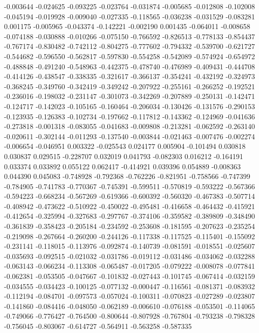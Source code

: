-0.003644
-0.024625
-0.093225
-0.023764
-0.031874
-0.005685
-0.012808
-0.102008
-0.045194
-0.019928
-0.009040
-0.027335
-0.118565
-0.036238
-0.031529
-0.083281
0.001175
-0.005965
-0.043374
-0.142221
-0.002190
0.001435
-0.064011
-0.008658
-0.074188
-0.030888
-0.010266
-0.075150
-0.766592
-0.826513
-0.778133
-0.854437
-0.767174
-0.830482
-0.742112
-0.804275
-0.777602
-0.794332
-0.539700
-0.621727
-0.544682
-0.596550
-0.562817
-0.597830
-0.554258
-0.542089
-0.574924
-0.654972
-0.488848
-0.491240
-0.548963
-0.442375
-0.478740
-0.476989
-0.409431
-0.444708
-0.414126
-0.438547
-0.338335
-0.321617
-0.366137
-0.354241
-0.432192
-0.324973
-0.368245
-0.349760
-0.342419
-0.349242
-0.207922
-0.255161
-0.266252
-0.192521
-0.236016
-0.198032
-0.231147
-0.301073
-0.342269
-0.207889
-0.250131
-0.142471
-0.124717
-0.142023
-0.105165
-0.160464
-0.206034
-0.130426
-0.131576
-0.290153
-0.123935
-0.126383
-0.102734
-0.197662
-0.117812
-0.143362
-0.124969
-0.041636
-0.273818
-0.001318
-0.083055
-0.041683
-0.009808
-0.213281
-0.062592
-0.263140
-0.020611
-0.302144
-0.011293
-0.137540
-0.003844
-0.021463
-0.007476
-0.002274
-0.006654
-0.046951
0.003322
-0.025543
0.024177
0.005904
-0.101494
0.030818
0.030837
0.029515
-0.228707
0.032019
0.041793
-0.082303
0.016212
-0.164191
0.033374
0.033892
0.055122
0.062417
-0.414921
0.039396
0.054889
-0.008363
0.044390
0.045083
-0.748928
-0.792368
-0.762226
-0.821951
-0.758566
-0.747399
-0.784905
-0.741783
-0.770367
-0.745391
-0.599511
-0.570819
-0.593222
-0.567366
-0.594223
-0.668234
-0.567269
-0.619366
-0.600392
-0.560320
-0.467383
-0.507714
-0.408942
-0.473622
-0.510922
-0.450022
-0.495481
-0.416658
-0.464432
-0.415921
-0.412654
-0.325994
-0.327683
-0.297767
-0.374106
-0.359582
-0.389809
-0.348490
-0.361839
-0.358423
-0.205184
-0.234592
-0.253608
-0.181595
-0.207623
-0.235254
-0.219098
-0.267664
-0.260200
-0.244126
-0.117338
-0.117525
-0.115401
-0.155092
-0.231141
-0.118015
-0.113976
-0.092874
-0.140739
-0.081591
-0.018551
-0.025607
-0.035693
-0.092515
-0.021032
-0.031786
-0.019112
-0.031486
-0.034062
-0.032288
-0.063143
-0.066234
-0.113308
-0.065487
-0.017205
-0.079222
-0.008078
-0.077841
-0.062381
-0.053505
-0.047667
-0.101832
-0.027443
-0.101745
-0.067414
-0.032159
-0.034555
-0.034423
-0.100125
-0.077132
-0.000447
-0.116561
-0.081371
-0.083932
-0.112194
-0.084701
-0.097573
-0.057024
-0.100311
-0.070823
-0.027289
-0.023807
-0.141860
-0.084416
-0.048050
-0.062189
-0.006610
-0.076188
-0.053501
-0.114065
-0.749066
-0.776427
-0.764500
-0.800644
-0.807928
-0.767804
-0.793238
-0.798328
-0.756045
-0.803067
-0.614727
-0.564911
-0.563258
-0.587335
